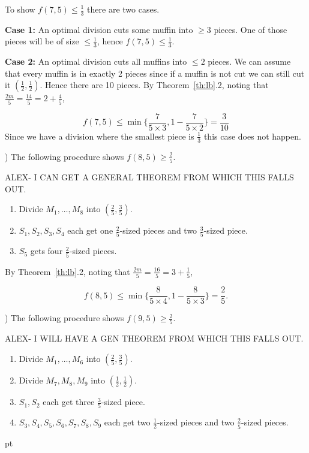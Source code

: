 \documentclass[12pt]{article}
\newenvironment{proof}
    {\pagebreak[1]{\narrower\noindent {\bf Proof:\quad\nopagebreak}}}{\QED}
\newcommand{\yyskip}{\penalty-50\vskip 5pt plus 3pt minus 2pt}
\newcommand{\blackslug}{\hbox{\hskip 1pt
        \vrule width 4pt height 8pt depth 1.5pt\hskip 1pt}}
\newcommand{\QED}{{\penalty10000\parindent 0pt\penalty10000
        \hskip 8 pt\nolinebreak\blackslug\hfill\lower 8.5pt\null}
        \par\yyskip\pagebreak[1]}
\begin{document}
\begin{proof}
To show $f(7,5) \le \frac{1}{3}$ there are two cases.

\noindent
{\bf Case 1:} An optimal division cuts some muffin into $\ge 3$ pieces.
One of those pieces will be of size $\le\frac{1}{3}$, hence
$f(7,5)\le \frac{1}{3}$.

\noindent
{\bf Case 2:} An optimal division cuts all muffins into $\le 2$ pieces.
We can assume that every muffin is in exactly 2 pieces since if a muffin is not cut
we can still cut it $(\frac{1}{2},\frac{1}{2})$. Hence there are 10 pieces.
By Theorem~\ref{th:lb}.2, noting that $\frac{2m}{5}=\frac{14}{5}=2+\frac{4}{5}$,

$$f(7,5) \le \min\biggl \{
\frac{7}{5\times 3},
1-\frac{7}{5\times 2}
\biggr \}
=
\frac{3}{10}
$$
Since we have a division where the smallest piece is $\frac{1}{3}$ this case does not happen.


) The following procedure shows $f(8,5) \ge \frac{2}{5}$.

ALEX- I CAN GET A GENERAL THEOREM FROM WHICH THIS FALLS OUT.

\begin{enumerate}
\item
Divide $M_{1},\ldots,M_8$ into $(\frac{2}{5},\frac{3}{5})$.
\item
$S_1,S_2,S_3,S_4$ each get one $\frac{2}{5}$-sized pieces and two $\frac{3}{5}$-sized piece.
\item
$S_5$ gets four $\frac{2}{5}$-sized pieces.
\end{enumerate}

By Theorem~\ref{th:lb}.2,  
noting that $\frac{2m}{5}=\frac{16}{5}=3+\frac{1}{5}$,


$$f(8,5) 
\le  
\min\biggl 
\{
\frac{8}{5\times 4},
1-\frac{8}{5\times 3}
\biggr 
\}
=
\frac{2}{5}.
$$


) The following procedure shows $f(9,5) \ge \frac{2}{5}$.

ALEX- I WILL HAVE A GEN THEOREM FROM WHICH THIS FALLS OUT.

\begin{enumerate}
\item
Divide $M_{1},\ldots,M_6$ into $(\frac{2}{5},\frac{3}{5})$.
\item
Divide $M_{7},M_8,M_9$ into $(\frac{1}{2},\frac{1}{2})$.
\item
$S_1,S_2$ each get three $\frac{3}{5}$-sized piece.
\item
$S_3,S_4,S_5,S_6,S_7,S_8,S_9$ each get two $\frac{1}{2}$-sized pieces and two $\frac{2}{5}$-sized pieces.
\end{enumerate}



\end{proof}
\end{document}
